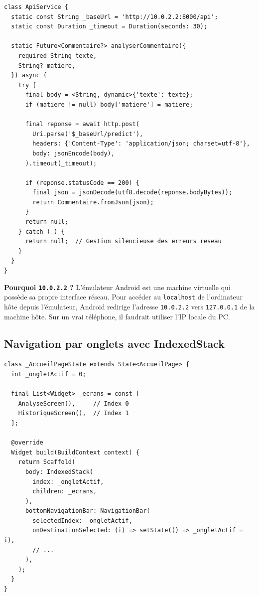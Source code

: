 \begin{lstlisting}[style=styleDart, caption={Service HTTP Flutter}, label={lst:flutter_api}]
class ApiService {
  static const String _baseUrl = 'http://10.0.2.2:8000/api';
  static const Duration _timeout = Duration(seconds: 30);

  static Future<Commentaire?> analyserCommentaire({
    required String texte,
    String? matiere,
  }) async {
    try {
      final body = <String, dynamic>{'texte': texte};
      if (matiere != null) body['matiere'] = matiere;

      final reponse = await http.post(
        Uri.parse('$_baseUrl/predict'),
        headers: {'Content-Type': 'application/json; charset=utf-8'},
        body: jsonEncode(body),
      ).timeout(_timeout);

      if (reponse.statusCode == 200) {
        final json = jsonDecode(utf8.decode(reponse.bodyBytes));
        return Commentaire.fromJson(json);
      }
      return null;
    } catch (_) {
      return null;  // Gestion silencieuse des erreurs reseau
    }
  }
}
\end{lstlisting}

\textbf{Pourquoi \texttt{10.0.2.2} ?} L'émulateur Android est une machine
virtuelle qui possède sa propre interface réseau. Pour accéder au
\texttt{localhost} de l'ordinateur hôte depuis l'émulateur, Android
redirige l'adresse \texttt{10.0.2.2} vers \texttt{127.0.0.1} de la machine
hôte. Sur un vrai téléphone, il faudrait utiliser l'IP locale du PC.

\subsection{Navigation par onglets avec IndexedStack}

\begin{lstlisting}[style=styleDart, caption={Navigation IndexedStack}, label={lst:navigation}]
class _AccueilPageState extends State<AccueilPage> {
  int _ongletActif = 0;

  final List<Widget> _ecrans = const [
    AnalyseScreen(),     // Index 0
    HistoriqueScreen(),  // Index 1
  ];

  @override
  Widget build(BuildContext context) {
    return Scaffold(
      body: IndexedStack(
        index: _ongletActif,
        children: _ecrans,
      ),
      bottomNavigationBar: NavigationBar(
        selectedIndex: _ongletActif,
        onDestinationSelected: (i) => setState(() => _ongletActif = i),
        // ...
      ),
    );
  }
}
\end{lstlisting}


